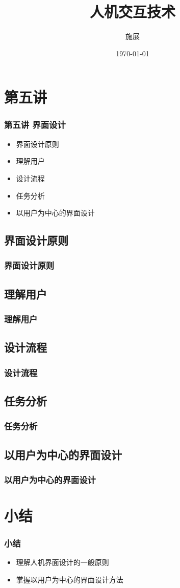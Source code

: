 \documentclass{beamer}
\title{人机交互技术}
\author{施展}
\institute{华中科技大学~武汉光电国家实验室}
\date{\today}
\begin{document}
\begin{frame}
	\titlepage
\end{frame}

\begin{frame}
	\tableofcontents
\end{frame}

\section{第五讲}
\begin{frame}
	\frametitle{第五讲 界面设计}
	\begin{itemize}
		\item 界面设计原则
		\item 理解用户
		\item 设计流程
		\item 任务分析
		\item 以用户为中心的界面设计
	\end{itemize}
\end{frame}

\subsection{界面设计原则}
\begin{frame}
	\frametitle{界面设计原则}

\end{frame}

\subsection{理解用户}
\begin{frame}
	\frametitle{理解用户}

\end{frame}

\subsection{设计流程}
\begin{frame}
	\frametitle{设计流程}

\end{frame}

\subsection{任务分析}
\begin{frame}
	\frametitle{任务分析}

\end{frame}

\subsection{以用户为中心的界面设计}
\begin{frame}
	\frametitle{以用户为中心的界面设计}

\end{frame}

\section{小结}
\begin{frame}
	\frametitle{小结}
	\begin{itemize}
		\item 理解人机界面设计的一般原则
		\item 掌握以用户为中心的界面设计方法
	\end{itemize}
\end{frame}
\end{document}
